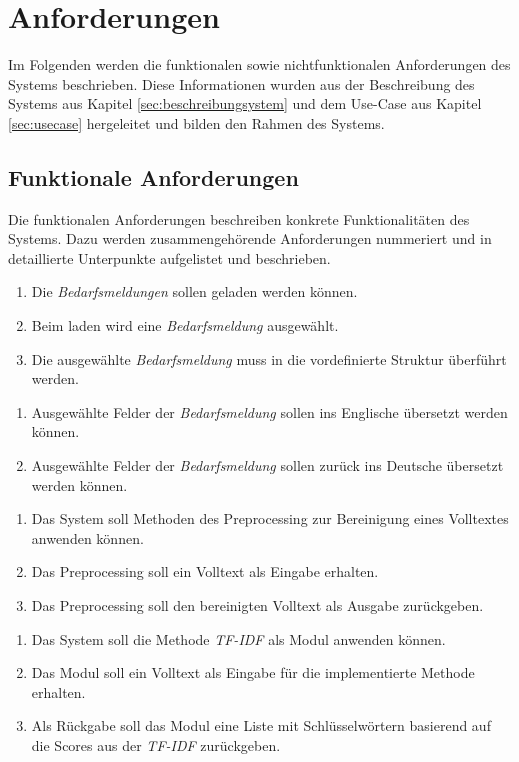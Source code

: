 \section{Anforderungen}
Im Folgenden werden die funktionalen sowie nichtfunktionalen Anforderungen des Systems beschrieben. Diese Informationen wurden aus der Beschreibung des Systems aus Kapitel \ref{sec:beschreibungsystem} und dem Use-Case aus Kapitel \ref{sec:usecase} hergeleitet und bilden den Rahmen des Systems.
\subsection{Funktionale Anforderungen}
Die funktionalen Anforderungen beschreiben konkrete Funktionalitäten des Systems. Dazu werden zusammengehörende Anforderungen nummeriert und in detaillierte Unterpunkte aufgelistet und beschrieben.
\begin{enumerate}[label=1.\arabic*]
	\item Die \emph{Bedarfsmeldungen} sollen geladen werden können.
	\item Beim laden wird eine \emph{Bedarfsmeldung} ausgewählt.
	\item Die ausgewählte \emph{Bedarfsmeldung} muss in die vordefinierte Struktur überführt werden.
\end{enumerate}
\begin{enumerate}[label=2.\arabic*]
	\item Ausgewählte Felder der \emph{Bedarfsmeldung} sollen ins Englische übersetzt werden können.
	\item Ausgewählte Felder der \emph{Bedarfsmeldung} sollen zurück ins Deutsche übersetzt werden können.
\end{enumerate}
\begin{enumerate}[label=3.\arabic*]
	\item Das System soll Methoden des Preprocessing zur Bereinigung eines Volltextes anwenden können.
	\item Das Preprocessing soll ein Volltext als Eingabe erhalten.
	\item Das Preprocessing soll den bereinigten Volltext als Ausgabe zurückgeben.
\end{enumerate}
\begin{enumerate}[label=4.\arabic*]
	\item Das System soll die Methode \emph{TF-IDF} als Modul anwenden können.
	\item Das Modul soll ein Volltext als Eingabe für die implementierte Methode erhalten.
	\item Als Rückgabe soll das Modul eine Liste mit Schlüsselwörtern basierend auf die Scores aus der \emph{TF-IDF} zurückgeben.
\end{enumerate}

